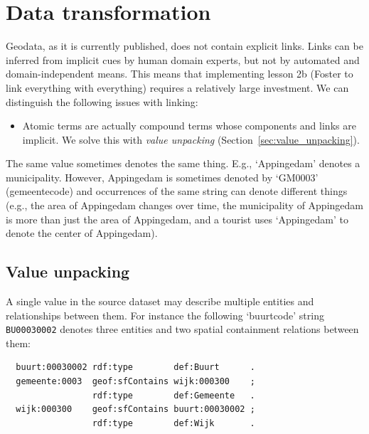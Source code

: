 \documentclass[a4paper]{scrartcl}
\newcommand{\textt}[1]{{\small \texttt{#1}}}
\begin{document}
\section{Data transformation}
\label{sec:conversion}
\label{sec:enrichment}
\label{sec:transformation}

Geodata, as it is currently published, does not contain explicit
links.  Links can be inferred from implicit cues by human domain
experts, but not by automated and domain-independent means.  This
means that implementing lesson 2b (Foster to link everything with
everything) requires a relatively large investment.  We can
distinguish the following issues with linking:

\begin{itemize}
  \item Atomic terms are actually compound terms whose components and
    links are implicit.  We solve this with \emph{value unpacking}
    (Section~\ref{sec:value_unpacking}).
\end{itemize}

The same value sometimes denotes the same thing.  E.g., `Appingedam'
denotes a municipality.  However, Appingedam is sometimes denoted by
`GM0003' (gemeentecode) and occurrences of the same string can denote
different things (e.g., the area of Appingedam changes over time, the
municipality of Appingedam is more than just the area of Appingedam,
and a tourist uses `Appingedam' to denote the center of Appingedam).



\subsection{Value unpacking}
\label{sec:grammar}
\label{sec:value_unpacking}

A single value in the source dataset may describe multiple entities
and relationships between them.  For instance the following
`buurtcode' string \textt{BU00030002} denotes three entities and two
spatial containment relations between them:

\begin{verbatim}
  buurt:00030002 rdf:type        def:Buurt      .
  gemeente:0003  geof:sfContains wijk:000300    ;
                 rdf:type        def:Gemeente   .
  wijk:000300    geof:sfContains buurt:00030002 ;
                 rdf:type        def:Wijk       .
\end{verbatim}
\end{document}
